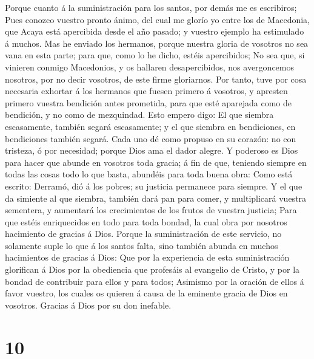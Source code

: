  Porque cuanto á la suministración para los santos, por
demás me es escribiros;  Pues conozco vuestro pronto
ánimo, del cual me glorío yo entre los de Macedonia, que Acaya está
apercibida desde el año pasado; y vuestro ejemplo ha estimulado á
muchos.  Mas he enviado los hermanos, porque nuestra
gloria de vosotros no sea vana en esta parte; para que, como lo he
dicho, estéis apercibidos;  No sea que, si vinieren
conmigo Macedonios, y os hallaren desapercibidos, nos avergoncemos
nosotros, por no decir vosotros, de este firme gloriarnos.
 Por tanto, tuve por cosa necesaria exhortar á los
hermanos que fuesen primero á vosotros, y apresten primero vuestra
bendición antes prometida, para que esté aparejada como de bendición, y
no como de mezquindad.  Esto empero digo: El que siembra
escasamente, también segará escasamente; y el que siembra en
bendiciones, en bendiciones también segará.  Cada uno dé
como propuso en su corazón: no con tristeza, ó por necesidad; porque
Dios ama el dador alegre.  Y poderoso es Dios para hacer
que abunde en vosotros toda gracia; á fin de que, teniendo siempre en
todas las cosas todo lo que basta, abundéis para toda buena obra:
 Como está escrito: Derramó, dió á los pobres; su justicia
permanece para siempre.  Y el que da simiente al que
siembra, también dará pan para comer, y multiplicará vuestra sementera,
y aumentará los crecimientos de los frutos de vuestra justicia;
 Para que estéis enriquecidos en todo para toda bondad,
la cual obra por nosotros hacimiento de gracias á Dios. 
Porque la suministración de este servicio, no solamente suple lo que á
los santos falta, sino también abunda en muchos hacimientos de gracias á
Dios:  Que por la experiencia de esta suministración
glorifican á Dios por la obediencia que profesáis al evangelio de
Cristo, y por la bondad de contribuir para ellos y para todos;
 Asimismo por la oración de ellos á favor vuestro, los
cuales os quieren á causa de la eminente gracia de Dios en vosotros.
 Gracias á Dios por su don inefable.

\hypertarget{section-9}{%
\section{10}\label{section-9}}

